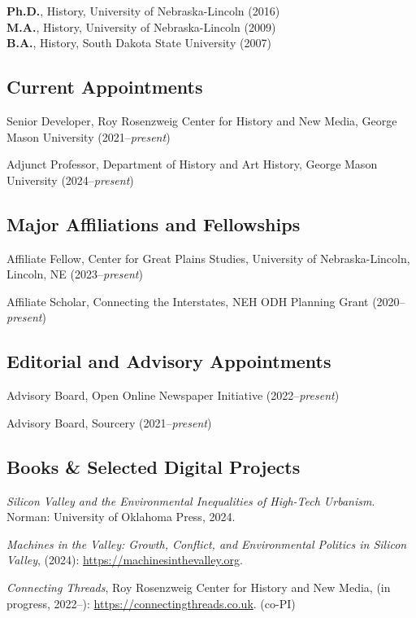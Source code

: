 \documentclass[10pt]{article}
\begin{document}
\textbf{Ph.D.}, History, University of Nebraska-Lincoln (2016) \\
\textbf{M.A.}, History, University of Nebraska-Lincoln (2009) \\
\textbf{B.A.}, History, South Dakota State University (2007)

\subsection{Current Appointments}\label{Appointments}

Senior Developer, Roy Rosenzweig Center for History and New Media, George Mason University (2021--\textit{present})

Adjunct Professor, Department of History and Art History, George Mason University (2024--\textit{present})

\subsection{Major Affiliations and Fellowships}\label{affiliations-and-fellowships}

Affiliate Fellow, Center for Great Plains Studies, University of Nebraska-Lincoln, Lincoln, NE (2023--\textit{present})

Affiliate Scholar, Connecting the Interstates, NEH ODH Planning Grant (2020--\textit{present})

\subsection{Editorial and Advisory Appointments}\label{editorial-and-advisory-appointments}

Advisory Board, Open Online Newspaper Initiative (2022--\textit{present})

Advisory Board, Sourcery (2021--\textit{present})

\subsection{Books \& Selected Digital Projects}\label{books}

\textit{Silicon Valley and the Environmental Inequalities of High-Tech Urbanism}. Norman: University of Oklahoma Press, 2024.

\emph{Machines in the Valley: Growth, Conflict, and Environmental Politics in Silicon Valley}, (2024): \url{https://machinesinthevalley.org}.

\emph{Connecting Threads}, Roy Rosenzweig Center for History and New Media, (in progress, 2022--): \url{https://connectingthreads.co.uk}. (co-PI)
\end{document}
